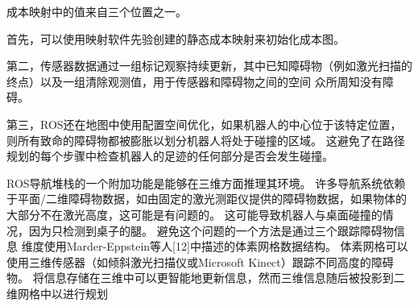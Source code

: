 成本映射中的值来自三个位置之一。

首先，可以使用映射软件先验创建的静态成本映射来初始化成本图。

第二，传感器数据通过一组标记观察持续更新，其中已知障碍物（例如激光扫描的终点）以及一组清除观测值，用于传感器和障碍物之间的空间 众所周知没有障碍。

第三，ROS还在地图中使用配置空间优化，如果机器人的中心位于该特定位置，则所有致命的障碍物都被膨胀以划分机器人将处于碰撞的区域。 这避免了在路径规划的每个步骤中检查机器人的足迹的任何部分是否会发生碰撞。

ROS导航堆栈的一个附加功能是能够在三维方面推理其环境。 许多导航系统依赖于平面/二维障碍物数据，如由固定的激光测距仪提供的障碍物数据，如果物体的大部分不在激光高度，这可能是有问题的。 这可能导致机器人与桌面碰撞的情况，因为只检测到桌子的腿。 避免这个问题的一个方法是通过三个跟踪障碍物信息
维度使用Marder-Eppstein等人[12]中描述的体素网格数据结构。 体素网格可以使用三维传感器（如倾斜激光扫描仪或Microsoft Kinect）跟踪不同高度的障碍物。 将信息存储在三维中可以更智能地更新信息，然而三维信息随后被投影到二维网格中以进行规划


